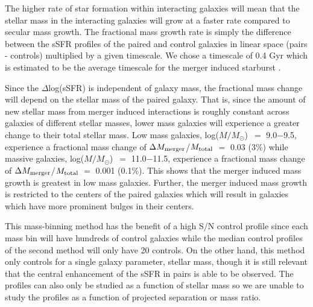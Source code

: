 \documentclass[iop,revtex4,twocolumn,apj,numberedappendix,appendixfloats]{emulateapj}
\newcommand{\logm}{log($M/M_{\odot}$)}
\begin{document}
The higher rate of star formation within interacting galaxies will mean that the stellar mass in the interacting galaxies will grow at a faster rate compared to secular mass growth. The fractional mass growth rate is simply the difference between the sSFR profiles of the paired and control galaxies in linear space (pairs - controls) multiplied by a given timescale. We chose a timescale of 0.4 Gyr which is estimated to be the average timescale for the merger induced starburst \citep{Feng:2019}. 

Since the $\Delta$log(sSFR) is independent of galaxy mass, the fractional mass change will depend on the stellar mass of the paired galaxy. That is, since the amount of new stellar mass from merger induced interactions is roughly constant across galaxies of different stellar masses, lower mass galaxies will experience a greater change to their total stellar mass. Low mass galaxies, \logm\ $=$ 9.0$-$9.5, experience a fractional mass change of $\Delta M_{\rm merger}$/$M_{\rm total}$ $=$ 0.03 (3\%) while massive galaxies, \logm\ $=$ 11.0$-$11.5, experience a fractional mass change of $\Delta M_{\rm merger}$/$M_{\rm total}$ $=$ 0.001 (0.1\%). This shows that the merger induced mass growth is greatest in low mass galaxies. Further, the merger induced mass growth is restricted to the centers of the paired galaxies which will result in galaxies which have more prominent bulges in their centers. 

This mass-binning method has the benefit of a high S/N control profile since each mass bin will have hundreds of control galaxies while the median control profiles of the second method will only have 20 controls. On the other hand, this method only controls for a single galaxy parameter, stellar mass, though it is still relevant that the central enhancement of the sSFR in pairs is able to be observed. The profiles can also only be studied as a function of stellar mass so we are unable to study the profiles as a function of projected separation or mass ratio. 
\end{document}
